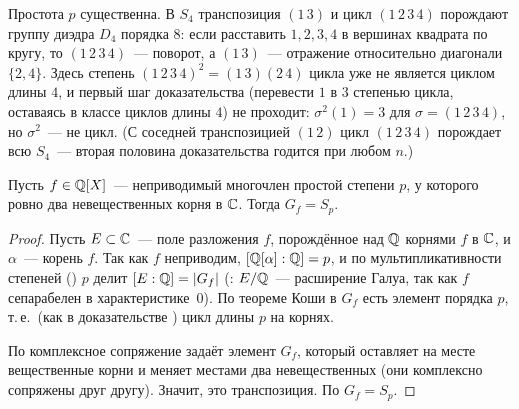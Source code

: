 \begin{center}
\begin{keepfig}
\centering
{}
\end{keepfig}
\end{center}

\begin{remark}[4.15a]
Простота $p$ существенна. В $S_4$ транспозиция $(1\,3)$ и цикл $(1\,2\,3\,4)$ порождают группу диэдра $D_4$ порядка $8$:
если расставить $1,2,3,4$ в вершинах квадрата по кругу, то $(1\,2\,3\,4)$~--- поворот, а $(1\,3)$~--- отражение относительно
диагонали $\{2,4\}$. Здесь степень $(1\,2\,3\,4)^2=(1\,3)(2\,4)$ цикла уже не является циклом длины $4$, и первый шаг
доказательства (перевести $1$ в $3$ степенью цикла, оставаясь в классе циклов длины $4$) не проходит: $\sigma^2(1)=3$ для
$\sigma=(1\,2\,3\,4)$, но $\sigma^2$~--- не цикл.
(С соседней транспозицией $(1\,2)$ цикл $(1\,2\,3\,4)$ порождает всю $S_4$~--- вторая половина доказательства годится при любом $n$.)
\end{remark}

\begin{proposition}[4.16]
Пусть $f\in\mathbb Q[X]$~--- неприводимый многочлен простой степени $p$, у которого ровно два невещественных корня в $\mathbb C$.
Тогда $G_f=S_p$.
\end{proposition}

\begin{proof}
Пусть $E\subset\mathbb C$~--- поле разложения $f$, порождённое над $\mathbb Q$ корнями $f$ в $\mathbb C$, и $\alpha$~--- корень $f$. Так как $f$
неприводим, $[\mathbb Q[\alpha]:\mathbb Q]=p$, и по мультипликативности степеней () $p$ делит $[E:\mathbb Q]=|G_f|$ (: $E/\mathbb Q$~---
расширение Галуа, так как $f$ сепарабелен в характеристике~$0$). По теореме Коши в $G_f$ есть элемент порядка $p$, т.\,е.\
(как в доказательстве ) цикл длины $p$ на корнях.

По  комплексное сопряжение задаёт элемент $G_f$, который оставляет на месте вещественные корни и меняет местами
два невещественных (они комплексно сопряжены друг другу). Значит, это транспозиция. По \rf{4.15} $G_f=S_p$.
\end{proof}

